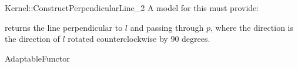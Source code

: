 \begin{ccRefFunctionObjectConcept}{Kernel::ConstructPerpendicularLine_2}
A model for this must provide:


        {returns the line perpendicular to $l$ and passing through $p$,
         where the direction is the direction of $l$ rotated 
         counterclockwise by 90 degrees.}

\ccRefines
AdaptableFunctor

\ccSeeAlso
{} \\

\end{ccRefFunctionObjectConcept}
